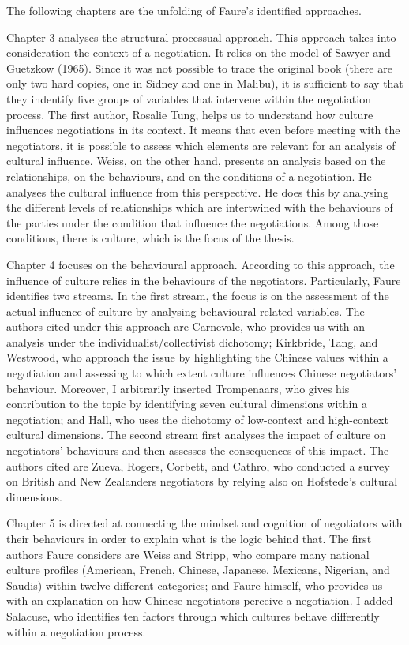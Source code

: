 ﻿\documentclass[../main.tex]{subfiles}
\begin{document}
The following chapters are the unfolding of Faure's identified approaches.

Chapter 3 analyses the structural-processual approach. This approach takes into consideration the context of a negotiation. It relies on the model of Sawyer and Guetzkow (1965). Since it was not possible to trace the original book (there are only two hard copies, one in Sidney and one in Malibu), it is sufficient to say that they indentify five groups of variables that intervene within the negotiation process.
The first author, Rosalie Tung, helps us to understand how culture influences negotiations in its context. It means that even before meeting with the negotiators, it is possible to assess which elements are relevant for an analysis of cultural influence.
Weiss, on the other hand, presents an analysis based on the relationships, on the behaviours, and on the conditions of a negotiation. He analyses the cultural influence from this perspective. He does this by analysing the different levels of relationships which are intertwined with the behaviours of the parties under the condition that influence the negotiations. Among those conditions, there is culture, which is the focus of the thesis.

Chapter 4 focuses on the behavioural approach. According to this approach, the influence of culture relies in the behaviours of the negotiators.
Particularly, Faure identifies two streams.
In the first stream, the focus is on the assessment of the actual influence of culture by analysing behavioural-related variables. The authors cited under this approach are Carnevale, who provides us with an analysis under the individualist/collectivist dichotomy; Kirkbride, Tang, and Westwood, who approach the issue by highlighting the Chinese values within a negotiation and assessing to which extent culture influences Chinese negotiators' behaviour. Moreover, I arbitrarily inserted Trompenaars, who gives his contribution to the topic by identifying seven cultural dimensions within a negotiation; and Hall, who uses the dichotomy of low-context and high-context cultural dimensions.
The second stream first analyses the impact of culture on negotiators' behaviours and then assesses the consequences of this impact. The authors cited are Zueva, Rogers, Corbett, and Cathro, who conducted a survey on British and New Zealanders negotiators by relying also on Hofstede's cultural dimensions.

Chapter 5 is directed at connecting the mindset and cognition of negotiators with their behaviours in order to explain what is the logic behind that.
The first authors Faure considers are Weiss and Stripp, who compare many national culture profiles (American, French, Chinese, Japanese, Mexicans, Nigerian, and Saudis) within twelve different categories; and Faure himself, who provides us with an explanation on how Chinese negotiators perceive a negotiation. I added Salacuse, who identifies ten factors through which cultures behave differently within a negotiation process.
\end{document}
